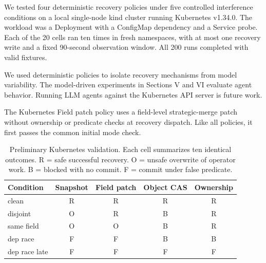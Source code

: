 \documentclass[conference,10pt]{IEEEtran}
\begin{document}
We tested four deterministic recovery policies under five controlled interference conditions on a local single-node kind cluster running Kubernetes v1.34.0. The workload was a Deployment with a ConfigMap dependency and a Service probe. Each of the 20 cells ran ten times in fresh namespaces, with at most one recovery write and a fixed 90-second observation window. All 200 runs completed with valid fixtures.

We used deterministic policies to isolate recovery mechanisms from model variability. The model-driven experiments in Sections V and VI evaluate agent behavior. Running LLM agents against the Kubernetes API server is future work.

The Kubernetes Field patch policy uses a field-level strategic-merge patch without ownership or predicate checks at recovery dispatch. Like all policies, it first passes the common initial mode check.

\begin{table}[!t]

\caption{Preliminary Kubernetes validation. Each cell summarizes ten identical outcomes. R = safe successful recovery. O = unsafe overwrite of operator work. B = blocked with no commit. F = commit under false predicate.}

\label{tab:4}

\centering\footnotesize

\setlength{\tabcolsep}{3pt}

\renewcommand{\arraystretch}{1.12}

\begin{tabular}{@{}lcccc@{}}

\toprule

Condition & Snapshot & Field patch & Object CAS & Ownership \\

\midrule

clean & R & R & R & R \\

disjoint & O & R & B & R \\

same field & O & O & B & R \\

dep race & F & F & B & B \\

dep race late & F & F & F & F \\

\bottomrule

\end{tabular}

\end{table}
\end{document}
